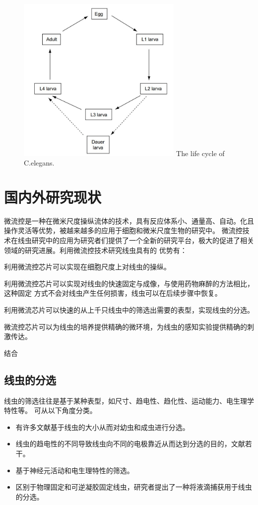 	\begin{figure}[h]
	  \centering
	  \includegraphics[width=8cm]{figure/chap1/lifecycle.jpg}
		{The life cycle of C.elegans.}
	  \label{fig:lifecycle}
	\end{figure}
	
\section{国内外研究现状}
\label{sec:intro:analog}
	微流控是一种在微米尺度操纵流体的技术，具有反应体系小、通量高、自动。化且操作灵活等优势，被越来越多的应用于细胞和微米尺度生物的研究中。
	微流控技术在线虫研究中的应用为研究者们提供了一个全新的研究平台，极大的促进了相关领域的研究进展。利用微流控技术研究线虫具有的
	优势有：\begin{enumerate*}[label=\itshape\alph*)\upshape]
	\item 利用微流控芯片可以实现在细胞尺度上对线虫的操纵。\quad
	\item 利用微流控芯片可以实现对线虫的快速固定与成像，与使用药物麻醉的方法相比，这种固定
		方式不会对线虫产生任何损害，线虫可以在后续步骤中恢复。\quad
	\item 利用微流芯片可以快速的从上千只线虫中的筛选出需要的表型，实现线虫的分选。\quad
	\item 微流控芯片可以为线虫的培养提供精确的微环境，为线虫的感知实验提供精确的刺激传达。\quad
\end{enumerate*}
	结合
	
\subsection{线虫的分选}
\label{sec:intro:analog}
	线虫的筛选往往是基于某种表型，如尺寸、趋电性、趋化性、运动能力、电生理学特性等。
	可从以下角度分类。
	\begin{itemize}
	  \item 有许多文献基于线虫的大小从而对幼虫和成虫进行分选。
	  \item 线虫的趋电性的不同导致线虫向不同的电极靠近从而达到分选的目的，文献若干。
	  \item 基于神经元活动和电生理特性的筛选。
	  \item 区别于物理固定和可逆凝胶固定线虫，研究者提出了一种将液滴捕获用于线虫的分选。
	\end{itemize}
	
